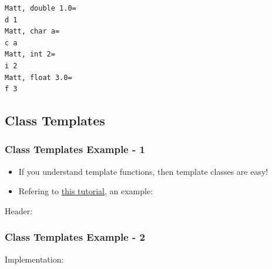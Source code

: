 \begin{verbatim}
Matt, double 1.0=
d 1
Matt, char a=
c a
Matt, int 2=
i 2
Matt, float 3.0=
f 3
\end{verbatim}

\subsection{Class Templates}\label{class-templates}

\subsubsection{Class Templates Example -
1}\label{class-templates-example---1}

\begin{itemize}
\itemsep1pt\parskip0pt
\item
  If you understand template functions, then template classes are easy!
\item
  Refering to
  \href{http://www.cplusplus.com/doc/tutorial/templates/}{this
  tutorial}, an example:
\end{itemize}

Header:

\begin{Shaded}
\begin{Highlighting}[]
 \NormalTok{<}  
  \NormalTok{T m_Values[}\NormalTok{];}

\NormalTok{:}
    
  \NormalTok{;}
\NormalTok{\};}
\end{Highlighting}
\end{Shaded}

\subsubsection{Class Templates Example -
2}\label{class-templates-example---2}

Implementation:

